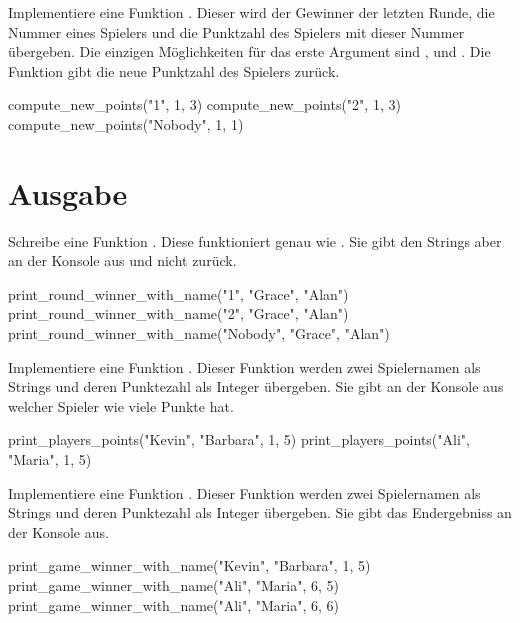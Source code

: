 \documentclass[a4paper, DIV = calc]{scrartcl}
\begin{document}
\begin{aufgabe}
Implementiere eine Funktion . Dieser wird der Gewinner der letzten Runde, die Nummer eines Spielers und die Punktzahl des Spielers mit dieser Nummer übergeben. Die einzigen Möglichkeiten für das erste Argument sind  ,  und .
Die Funktion gibt die neue Punktzahl des Spielers zurück.
\begin{pyconsole}
compute_new_points("1", 1, 3)
compute_new_points("2", 1,  3)
compute_new_points("Nobody", 1, 1)
\end{pyconsole}
\end{aufgabe}


\section{Ausgabe}

\begin{aufgabe}
Schreibe eine Funktion . Diese funktioniert genau wie . Sie gibt den Strings aber an der Konsole aus und nicht zurück.

\begin{pyconsole}
print_round_winner_with_name("1", "Grace", "Alan")
print_round_winner_with_name("2", "Grace", "Alan")
print_round_winner_with_name("Nobody", "Grace", "Alan")
\end{pyconsole}

\end{aufgabe}



\begin{aufgabe} \noindent 
Implementiere eine Funktion . Dieser Funktion werden zwei Spielernamen als Strings und deren Punktezahl als Integer übergeben. Sie gibt an der Konsole aus welcher Spieler wie viele Punkte hat.
\begin{pyconsole}
print_players_points("Kevin", "Barbara", 1, 5)
print_players_points("Ali", "Maria", 1, 5)
\end{pyconsole}
\end{aufgabe}

\begin{aufgabe} \noindent 
Implementiere eine Funktion . Dieser Funktion werden zwei Spielernamen als Strings und deren Punktezahl als Integer übergeben. Sie gibt das Endergebniss an der Konsole aus.
\begin{pyconsole}
print_game_winner_with_name("Kevin", "Barbara", 1, 5)
print_game_winner_with_name("Ali", "Maria", 6, 5)
print_game_winner_with_name("Ali", "Maria", 6, 6)
\end{pyconsole}
\end{aufgabe}
\end{document}
